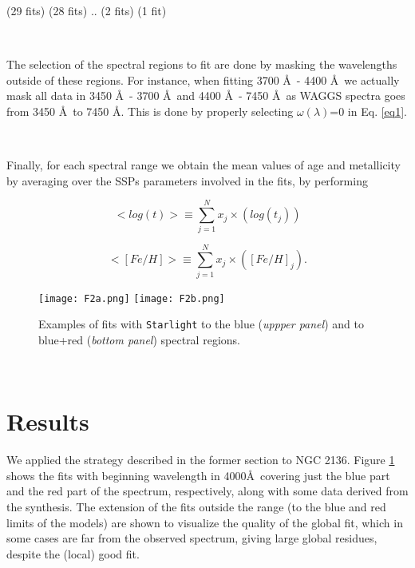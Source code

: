 \documentclass[baaa]{baaa}
\begin{document}
(29 fits)	  \hspace{0.5cm}	(28  fits)  \hspace{0.5cm}  ..	\hspace{0.5cm}    (2 fits)      \hspace{0.5cm}	(1 fit)

\

The selection of the spectral regions to fit are done by masking the wavelengths outside of these regions. For instance, when fitting 3700 \AA\ - 4400 \AA\ we actually mask all data in 3450 \AA\ - 3700 \AA\ and 4400 \AA\ - 7450 \AA\, as WAGGS spectra goes from 3450 \AA\ to 7450 \AA . This is done by properly selecting $\omega(\lambda)$=0 in Eq. \ref{eq1}.

\

Finally, for each spectral range we obtain the mean values of age and metallicity by averaging over the SSPs parameters involved in the fits, by performing

\begin{equation}
\label{eq2}
<log (t)> \equiv \sum_{j=1}^{N} x_j \times (log (t_j))
\end{equation}

\begin{equation}
\label{eq3}
<[Fe/H]> \equiv \sum_{j=1}^{N} x_j \times ([Fe/H]_j).
\end{equation}

\begin{figure}[!t]
\centering
\texttt{[image: F2a.png]}
\texttt{[image: F2b.png]}
\caption{Examples of fits with {\tt Starlight} to the blue (\emph {uppper panel}) and to blue+red (\emph{bottom panel}) spectral regions.}
\label{Blue}
\end{figure}

\

\section{Results}

We applied the strategy described in the former section to NGC 2136. Figure \ref{Blue} shows the fits with beginning wavelength in 4000\AA\ covering just the blue part and the red part of the spectrum, respectively, along with some data derived from the synthesis. The extension of the fits outside the range (to the blue and red limits of the models) are shown to visualize the quality of the global fit, which in some cases are far from the observed spectrum, giving large global residues, despite the (local) good fit.
\end{document}
